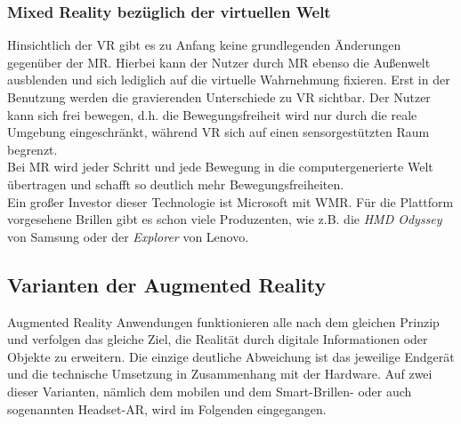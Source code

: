\subsubsection*{Mixed Reality bezüglich der virtuellen Welt}
Hinsichtlich der \acs{VR} gibt es zu Anfang keine grundlegenden Änderungen gegenüber der \acs{MR}. Hierbei kann der Nutzer durch 
\acs{MR} ebenso die Außenwelt ausblenden und sich lediglich auf die virtuelle Wahrnehmung fixieren. Erst in der Benutzung werden die 
gravierenden Unterschiede zu \acs{VR} sichtbar. Der Nutzer kann sich frei bewegen, d.h. die Bewegungsfreiheit wird nur durch 
die reale Umgebung eingeschränkt, während \acl{VR} sich auf einen sensorgestützten Raum begrenzt. \cite{vr.2018n}
\\ 
Bei \acs{MR} wird jeder Schritt und jede Bewegung in die computergenerierte Welt übertragen und schafft so deutlich mehr Bewegungsfreiheiten.
\\ 
\linebreak 
Ein großer Investor dieser Technologie ist Microsoft mit \ac{WMR}.
Für die Plattform vorgesehene Brillen gibt es schon viele Produzenten, wie z.B. 
die \textit{HMD Odyssey} von Samsung oder der \textit{Explorer} von Lenovo.

\subsection{Varianten der Augmented Reality}
\label{subchap:Varianten der AR}
Augmented Reality Anwendungen funktionieren alle nach dem gleichen Prinzip und verfolgen das gleiche Ziel, die Realität durch digitale Informationen 
oder Objekte zu erweitern. Die einzige deutliche Abweichung ist das jeweilige Endgerät und die technische Umsetzung in Zusammenhang mit der 
Hardware. Auf zwei dieser Varianten, nämlich dem mobilen und dem Smart-Brillen- oder auch sogenannten Headset-AR, wird im Folgenden 
eingegangen.

